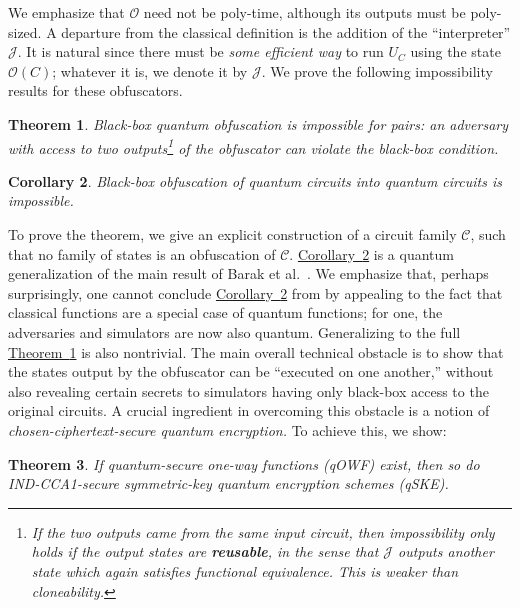 \documentclass[11pt]{amsart}
\numberwithin{equation}{section}
\newtheorem{theorem}{Theorem}
\newtheorem{corollary}[theorem]{Corollary}
\newcommand{\expref}[2]{\texorpdfstring{\hyperref[#2]{#1~\ref{#2}}}{#1~\ref{#2}}}
\newcommand{\algo}{\mathcal}
\begin{document}
\noindent We emphasize that $\algo O$ need not be poly-time, although its outputs must be poly-sized. A departure from the classical definition is the addition of the ``interpreter'' $\algo J$. It is natural since there must be \emph{some efficient way} to run $U_C$ using the state $\algo O(C)$; whatever it is, we denote it by $\algo J$. We prove the following impossibility results for these obfuscators.

\begin{theorem}\label{thm:main}
Black-box quantum obfuscation is impossible for pairs: an adversary with access to two outputs\footnote{If the two outputs came from the same input circuit, then impossibility only holds if the output states are \textbf{reusable}, in the sense that $\algo J$ outputs another state which again satisfies functional equivalence. This is weaker than cloneability.} of the obfuscator can violate the black-box condition.
\end{theorem}

\begin{corollary}\label{cor:main}
Black-box obfuscation of quantum circuits into quantum circuits is impossible.
\end{corollary}

\noindent To prove the theorem, we give an explicit construction of a circuit family $\mathcal C$, such that no family of states is an obfuscation of $\mathcal C$. \expref{Corollary}{cor:main} is a quantum generalization of the main result of Barak et al.~\cite{BGIRSVY01}. We emphasize that, perhaps surprisingly, one cannot conclude \expref{Corollary}{cor:main} from \cite{BGIRSVY01} by appealing to the fact that classical functions are a special case of quantum functions; for one, the adversaries and simulators are now also quantum. Generalizing to the full \expref{Theorem}{thm:main} is also nontrivial. The main overall technical obstacle is to show that the states output by the obfuscator can be ``executed on one another,'' without also revealing certain secrets to simulators having only black-box access to the original circuits. A crucial ingredient in overcoming this obstacle is a notion of \emph{chosen-ciphertext-secure quantum encryption.} To achieve this, we show:

\begin{theorem}\label{thm:cca}
If quantum-secure one-way functions (qOWF) exist, then so do IND-CCA1-secure symmetric-key quantum encryption schemes (qSKE).
\end{theorem}
\end{document}
